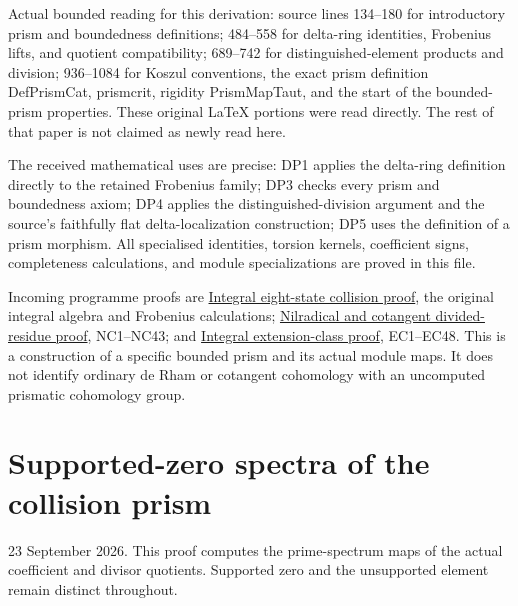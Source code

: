\documentclass[
  10pt,
  a4paper,
]{article}
\begin{document}
Actual bounded reading for this derivation: source lines 134--180 for
introductory prism and boundedness definitions; 484--558 for delta-ring
identities, Frobenius lifts, and quotient compatibility; 689--742 for
distinguished-element products and division; 936--1084 for Koszul
conventions, the exact prism definition DefPrismCat, prismcrit, rigidity
PrismMapTaut, and the start of the bounded-prism properties. These
original LaTeX portions were read directly. The rest of that paper is
not claimed as newly read here.

The received mathematical uses are precise: DP1 applies the delta-ring
definition directly to the retained Frobenius family; DP3 checks every
prism and boundedness axiom; DP4 applies the distinguished-division
argument and the source's faithfully flat delta-localization
construction; DP5 uses the definition of a prism morphism. All
specialised identities, torsion kernels, coefficient signs, completeness
calculations, and module specializations are proved in this file.

Incoming programme proofs are
\href{https://github.com/KokunoYumeto/zeta-function-research-reader/blob/5a89872598df0902b7c1393cf8e4692ca3010a95/workbenches/splitzero-tandem/branches/tau-zero-prime-positivity/research_calculations/INTEGRAL_EIGHT_STATE_COLLISION_DERIVATION.md}{Integral
eight-state collision proof}, the original integral algebra and
Frobenius calculations;
\href{https://github.com/KokunoYumeto/zeta-function-research-reader/blob/5a89872598df0902b7c1393cf8e4692ca3010a95/workbenches/splitzero-tandem/branches/tau-zero-prime-positivity/research_calculations/NILRADICAL_COTANGENT_DIVIDED_RESIDUE_DERIVATION.md}{Nilradical
and cotangent divided-residue proof}, NC1--NC43; and
\href{NILRADICAL_COTANGENT_EXTENSION_CLASS_DERIVATION.md}{Integral
extension-class proof}, EC1--EC48. This is a construction of a specific
bounded prism and its actual module maps. It does not identify ordinary
de Rham or cotangent cohomology with an uncomputed prismatic cohomology
group.

\clearpage

\section{Supported-zero spectra of the collision
prism}\label{supported-zero-spectra-of-the-collision-prism}

23 September 2026. This proof computes the prime-spectrum maps of the
actual coefficient and divisor quotients. Supported zero and the
unsupported element remain distinct throughout.
\end{document}
